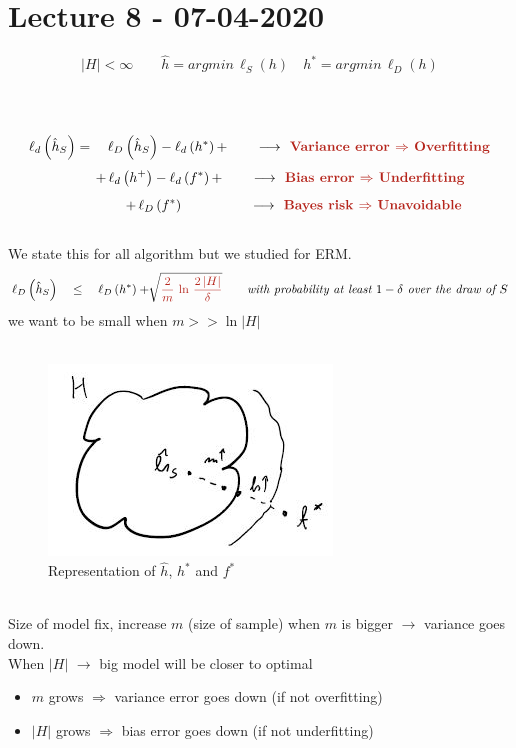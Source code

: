 \documentclass[../main.tex]{subfiles}
\begin{document}
\chapter{Lecture 8 - 07-04-2020}

$$
|H| < \infty \qquad \hat{h} = argmin \, \hat{\ell}_S \left(h\right) \quad h^* = argmin \, \ell_D\left(h\right)
$$

\\\\
$$
\ell_d\left(\hat{h}_S\right) = \quad \ell_D\left(\hat{h}_S\right) - \ell_d\left(h^*\right) + \qquad \longrightarrow \red{\textbf{ Variance error $\Rightarrow$ Overfitting}}
$$
$$
\qquad \quad +\,  \ell_d\left(h^+\right) - \ell_d\left(f^*\right) + \qquad \longrightarrow \red{\textbf{ Bias error $\Rightarrow$ Underfitting}}
$$
$$ \qquad \qquad \quad 
+ \, \ell_D\left(f^*\right)\qquad \qquad \quad  \longrightarrow \red{\textbf{ Bayes risk $\Rightarrow$ Unavoidable}} 
$$\\
We state this 
for all algorithm but we studied for ERM.
\\
$$
\ell_D\left(\hat{h}_S\right) \quad \leq \quad \ell_D \left(h^* \right) + \sqrt[]{ \red{\frac{2}{m} \, \ln \, \frac{2\, |H|}{\delta}}} \qquad \textit{with probability at least $1-\delta$ over the draw of $S$}
$$
we want  to be small when $m>> \ln|H|$
\\\\
\begin{figure}[h]
    \centering
    \includegraphics[width=0.5\linewidth]{../img/lez8-img1.JPG}
    \caption{Representation of $\hat{h}$, $h^*$ and $f^*$ }
\end{figure}\\
Size of model fix, increase $m$ (size of sample) when $m$ is bigger $\longrightarrow$ variance goes down.\\
When $|H|$ $\longrightarrow$ big model will be closer to optimal\\
\begin{itemize}
\item $m$ grows $\Rightarrow$ variance error goes down \qquad (if not overfitting)
\item $|H|$ grows $\Rightarrow$ bias error goes down \qquad (if not underfitting)
\end{itemize}
\end{document}
